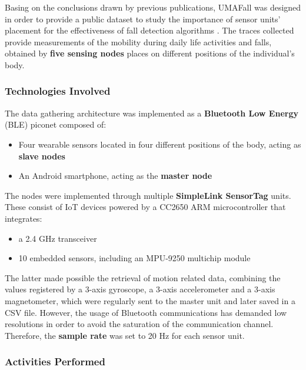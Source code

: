 Basing on the conclusions drawn by previous publications, UMAFall was designed in order to provide a public dataset to study the importance of sensor units' placement for the effectiveness of fall detection algorithms \cite{umafall}. The traces collected provide measurements of the mobility during daily life activities and falls, obtained by \textbf{five sensing nodes} places on different positions of the individual's body.

\subsubsection{Technologies Involved}\label{subsubsec:umafall-technologies}

The data gathering architecture was implemented as a \textbf{Bluetooth Low Energy} (BLE) piconet composed of:

\begin{itemize}
    \item Four wearable sensors located in four different positions of the body, acting as \textbf{slave nodes}
    \item An Android smartphone, acting as the \textbf{master node}
\end{itemize}

The nodes were implemented through multiple \textbf{SimpleLink SensorTag} units. These consist of IoT devices powered by a CC2650 ARM microcontroller that integrates: 

\begin{itemize}
    \item a 2.4 GHz transceiver
    \item 10 embedded sensors, including an MPU-9250 multichip module
\end{itemize}

The latter made possible the retrieval of motion related data, combining the values registered by a 3-axis gyroscope, a 3-axis accelerometer and a 3-axis magnetometer, which were regularly sent to the master unit and later saved in a CSV file. However, the usage of Bluetooth communications has demanded low resolutions in order to avoid the saturation of the communication channel. Therefore, the \textbf{sample rate} was set to 20 Hz for each sensor unit.

\subsubsection{Activities Performed}\label{subsubsec:umafall-activities}


